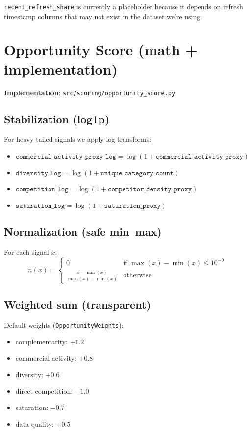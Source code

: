 \documentclass[11pt]{article}
\begin{document}
\noindent\texttt{recent\_refresh\_share} is currently a placeholder because it depends on refresh timestamp columns that may not exist in the dataset we’re using.

\section{Opportunity Score (math + implementation)}
\noindent\textbf{Implementation}: \texttt{src/scoring/opportunity\_score.py}

\subsection{Stabilization (log1p)}
For heavy-tailed signals we apply log transforms:
\begin{itemize}
  \item $\texttt{commercial\_activity\_proxy\_log}=\log(1+\texttt{commercial\_activity\_proxy})$
  \item $\texttt{diversity\_log}=\log(1+\texttt{unique\_category\_count})$
  \item $\texttt{competition\_log}=\log(1+\texttt{competitor\_density\_proxy})$
  \item $\texttt{saturation\_log}=\log(1+\texttt{saturation\_proxy})$
\end{itemize}

\subsection{Normalization (safe min--max)}
For each signal $x$:
\[
n(x)=
\begin{cases}
0 & \text{if } \max(x)-\min(x) \le 10^{-9}\\
\frac{x-\min(x)}{\max(x)-\min(x)} & \text{otherwise}
\end{cases}
\]

\subsection{Weighted sum (transparent)}
Default weights (\texttt{OpportunityWeights}):
\begin{itemize}
  \item complementarity: $+1.2$
  \item commercial activity: $+0.8$
  \item diversity: $+0.6$
  \item direct competition: $-1.0$
  \item saturation: $-0.7$
  \item data quality: $+0.5$
\end{itemize}
\end{document}
